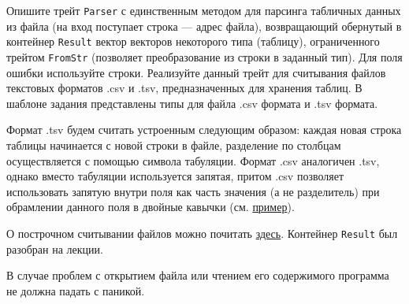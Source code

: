 \documentclass[a4paper, 10pt]{extarticle}
\begin{document}
\begin{tsk}
    Опишите трейт \verb|Parser| с единственным методом для парсинга табличных данных из файла (на вход поступает строка --- адрес файла), возвращающий обернутый в контейнер \verb|Result| вектор векторов некоторого типа (таблицу), ограниченного трейтом \verb|FromStr| (позволяет преобразование из строки в заданный тип). Для поля ошибки используйте строки. Реализуйте данный трейт для считывания файлов текстовых форматов .csv и .tsv, предназначенных для хранения таблиц. В шаблоне задания представлены типы для файла .csv формата и .tsv формата.

    Формат .tsv будем считать устроенным следующим образом: каждая новая строка таблицы начинается с новой строки в файле, разделение по столбцам осуществляется с помощью символа табуляции. Формат .csv аналогичен .tsv, однако вместо табуляции используется запятая, притом .csv позволяет использовать запятую внутри поля как часть значения (а не разделитель) при обрамлении данного поля в двойные кавычки (см. \href{https://ru.wikipedia.org/wiki/CSV#%D0%9F%D1%80%D0%B8%D0%BC%D0%B5%D1%80}{пример}).

    О построчном считывании файлов можно почитать \href{https://doc.rust-lang.org/rust-by-example/std_misc/file/read_lines.html}{здесь}. Контейнер \verb|Result| был разобран на лекции.

    В случае проблем с открытием файла или чтением его содержимого программа не должна падать с паникой.
\end{tsk}
\end{document}
